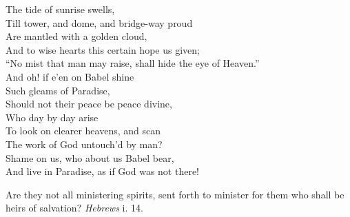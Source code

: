  The tide of sunrise swells, \\
 Till tower, and dome, and bridge-way proud \\
 Are mantled with a golden cloud, \\
 And to wise hearts this certain hope us given; \\
 “No mist that man may raise, shall hide the eye of Heaven.” \\
  And oh! if e’en on Babel shine \\
 Such gleams of Paradise, \\
 Should not their peace be peace divine, \\
 Who day by day arise \\
 To look on clearer heavens, and scan \\
 The work of God untouch’d by man? \\
 Shame on us, who about us Babel bear, \\
 And live in Paradise, as if God was not there!\\


Are they not all ministering spirits, sent forth to minister for them who shall be heirs of salvation? \emph{Hebrews} i. 14.

